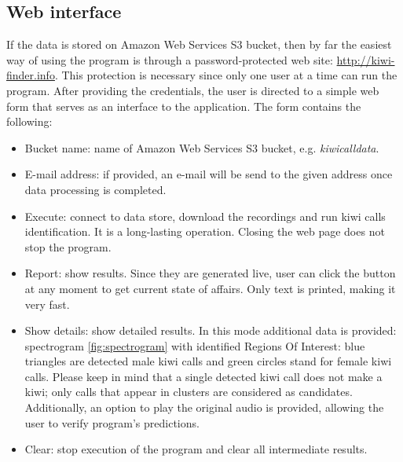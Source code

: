 \documentclass[paper=a4, fontsize=11pt]{scrartcl}	%
\numberwithin{equation}{section}		%
\numberwithin{figure}{section}			%
\numberwithin{table}{section}				%
\begin{document}
\subsection{Web interface}
\label{sec:web_interface}
If the data is stored on Amazon Web Services S3 bucket, then by far the easiest way of using the program is through a password-protected web site: \url{http://kiwi-finder.info}. This protection is necessary since only one user at a time can run the program. \newline
After providing the credentials, the user is directed to a simple web form that serves as an interface to the application. The form contains the following:
\begin{itemize}
	\item Bucket name: name of Amazon Web Services S3 bucket, e.g. \textit{kiwicalldata}.
	\item E-mail address: if provided, an e-mail will be send to the given address once data processing is completed.
	\item Execute: connect to data store, download the recordings and run kiwi calls identification. It is a long-lasting operation. Closing the web page does not stop the program.
	\item Report: show results. Since they are generated live, user can click the button at any moment to get current state of affairs. Only text is printed, making it very fast.
	\item Show details: show detailed results. In this mode additional data is provided: spectrogram \ref{fig:spectrogram} with identified Regions Of Interest: blue triangles are detected male kiwi calls and green circles stand for female kiwi calls. Please keep in mind that a single detected kiwi call does not make a kiwi; only calls that appear in clusters are considered as candidates. Additionally, an option to play the original audio is provided, allowing the user to verify program's predictions.
	\item Clear: stop execution of the program and clear all intermediate results.
\end{itemize}
\end{document}
